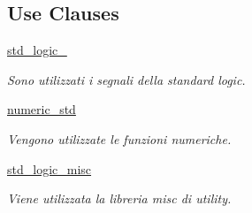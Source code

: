 \subsection*{Use Clauses}
 \begin{DoxyCompactItemize}
\item 
\mbox{\label{classGPIO__v1__0__S00__AXI_acd03516902501cd1c7296a98e22c6fcb}} 
\hyperlink{classGPIO__v1__0__S00__AXI_acd03516902501cd1c7296a98e22c6fcb}{std\+\_\+logic\+\_}   
\begin{DoxyCompactList}\small\item\em Sono utilizzati i segnali della standard logic. \end{DoxyCompactList}\item 
\mbox{\label{classGPIO__v1__0__S00__AXI_a2edc34402b573437d5f25fa90ba4013e}} 
\hyperlink{classGPIO__v1__0__S00__AXI_a2edc34402b573437d5f25fa90ba4013e}{numeric\+\_\+std}   
\begin{DoxyCompactList}\small\item\em Vengono utilizzate le funzioni numeriche. \end{DoxyCompactList}\item 
\mbox{\label{classGPIO__v1__0__S00__AXI_acb2d98d781f19c8f5f4109576ec45502}} 
\hyperlink{classGPIO__v1__0__S00__AXI_acb2d98d781f19c8f5f4109576ec45502}{std\+\_\+logic\+\_\+misc}   
\begin{DoxyCompactList}\small\item\em Viene utilizzata la libreria misc di utility. \end{DoxyCompactList}\end{DoxyCompactItemize}
